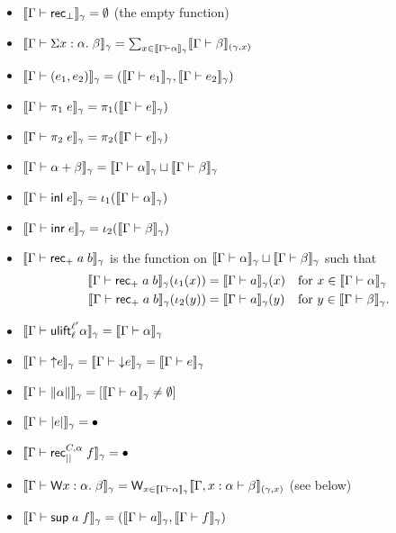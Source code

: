 \begin{itemize}
\item $\scott{\Gamma\vdash\rec_\bot}_\gamma=\emptyset$ (the empty function)
\item $\scott{\Gamma\vdash\Sigma x:\alpha.\;\beta}_\gamma=\sum_{x\in \scott{\Gamma\vdash\alpha}_\gamma}\scott{\Gamma\vdash\beta}_{(\gamma,x)}$
\item $\scott{\Gamma\vdash(e_1,e_2)}_\gamma=(\scott{\Gamma\vdash e_1}_\gamma,\scott{\Gamma\vdash e_2}_\gamma)$
\item $\scott{\Gamma\vdash\pi_1\;e}_\gamma=\pi_1(\scott{\Gamma\vdash e}_\gamma)$
\item $\scott{\Gamma\vdash\pi_2\;e}_\gamma=\pi_2(\scott{\Gamma\vdash e}_\gamma)$
\item $\scott{\Gamma\vdash\alpha+\beta}_\gamma=\scott{\Gamma\vdash\alpha}_\gamma\sqcup\scott{\Gamma\vdash\beta}_\gamma$
\item $\scott{\Gamma\vdash\inl e}_\gamma=\iota_1(\scott{\Gamma\vdash\alpha}_\gamma)$
\item $\scott{\Gamma\vdash\inr e}_\gamma=\iota_2(\scott{\Gamma\vdash\beta}_\gamma)$
\item $\scott{\Gamma\vdash\rec_+\;a\;b}_\gamma$ is the function on $\scott{\Gamma\vdash\alpha}_\gamma\sqcup\scott{\Gamma\vdash\beta}_\gamma$ such that
\begin{align*}
\scott{\Gamma\vdash\rec_+\;a\;b}_\gamma(\iota_1(x))&=\scott{\Gamma\vdash a}_\gamma(x)&&\mbox{for }x\in \scott{\Gamma\vdash\alpha}_\gamma\\
\scott{\Gamma\vdash\rec_+\;a\;b}_\gamma(\iota_2(y))&=\scott{\Gamma\vdash a}_\gamma(y)&&\mbox{for }y\in \scott{\Gamma\vdash\beta}_\gamma.
\end{align*}
\item $\scott{\Gamma\vdash\ulift_\ell^{\ell'} \alpha}_\gamma=\scott{\Gamma\vdash\alpha}_\gamma$
\item $\scott{\Gamma\vdash{\uparrow}e}_\gamma=\scott{\Gamma\vdash{\downarrow}e}_\gamma=\scott{\Gamma\vdash e}_\gamma$
\item $\scott{\Gamma\vdash\|\alpha\|}_\gamma=[\scott{\Gamma\vdash\alpha}_\gamma\ne \emptyset]$
\item $\scott{\Gamma\vdash|e|}_\gamma=\bullet$
\item $\scott{\Gamma\vdash\rec_{||}^{C,\alpha}\;f}_\gamma=\bullet$
\item $\scott{\Gamma\vdash\W x:\alpha.\;\beta}_\gamma=\W_{x\in\scott{\Gamma\vdash\alpha}_\gamma}\scott{\Gamma,x:\alpha\vdash\beta}_{(\gamma,x)}$ (see below)
\item $\scott{\Gamma\vdash\sup a\;f}_\gamma=(\scott{\Gamma\vdash a}_\gamma,\scott{\Gamma\vdash f}_\gamma)$

\end{itemize}
